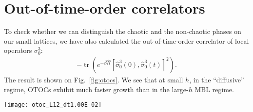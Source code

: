 \documentclass[10pt,amsmath,amssymb,twocolumn,superscriptaddress,groupedaddress,nofootinbib,aps,prd,twocolumn]{revtex4-2}
\newcommand{\lr}[1]{\left(#1\right)}
\newcommand{\lrs}[1]{\left[#1\right]}
\DeclareMathOperator{\tr}{tr}
\begin{document}
\section{Out-of-time-order correlators}
\label{sec:otocs}

To check whether we can distinguish the chaotic and the non-chaotic phases on our small lattices, we have also calculated the out-of-time-order correlator of local operators $\sigma^3_0$:
\begin{eqnarray}
\label{otoc_def}
 -\tr\lr{e^{-\beta \hat{H}} \lrs{\hat{\sigma}^3_0\lr{0}, \hat{\sigma}^3_0\lr{t}}^2 } .
\end{eqnarray}
The result is shown on Fig.~\ref{fig:otocs}. We see that at small $h$, in the ``diffusive'' regime, OTOCs exhibit much faster growth than in the large-$h$ MBL regime.

\begin{figure*}[h!pb]
  \centering
  \texttt{[image: otoc\_L12\_dt1.00E-02]}\\
  \caption{Time dependence of the out-of-time-order correlator for $L=12$ lattice in spin-0 sector at different values of $h$ and different temperatures.}
  \label{fig:otocs}
\end{figure*}



\end{document}
